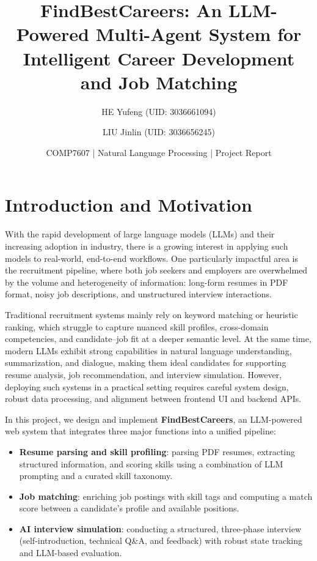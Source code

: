 \documentclass[11pt,a4paper]{article}
\title{\textbf{FindBestCareers: An LLM-Powered Multi-Agent System for Intelligent Career Development and Job Matching}}
\author{
    HE Yufeng (UID: 3036661094)
    \and
    LIU Jinlin (UID: 3036656245)
}
\date{COMP7607 | Natural Language Processing | Project Report}
\begin{document}
\maketitle

\section{Introduction and Motivation}

With the rapid development of large language models (LLMs) and their increasing adoption in industry, there is a growing interest in applying such models to real-world, end-to-end workflows. One particularly impactful area is the recruitment pipeline, where both job seekers and employers are overwhelmed by the volume and heterogeneity of information: long-form resumes in PDF format, noisy job descriptions, and unstructured interview interactions.

Traditional recruitment systems mainly rely on keyword matching or heuristic ranking, which struggle to capture nuanced skill profiles, cross-domain competencies, and candidate--job fit at a deeper semantic level. At the same time, modern LLMs exhibit strong capabilities in natural language understanding, summarization, and dialogue, making them ideal candidates for supporting resume analysis, job recommendation, and interview simulation. However, deploying such systems in a practical setting requires careful system design, robust data processing, and alignment between frontend UI and backend APIs.

In this project, we design and implement \textbf{FindBestCareers}, an LLM-powered web system that integrates three major functions into a unified pipeline:

\begin{itemize}
    \item \textbf{Resume parsing and skill profiling}: parsing PDF resumes, extracting structured information, and scoring skills using a combination of LLM prompting and a curated skill taxonomy.
    \item \textbf{Job matching}: enriching job postings with skill tags and computing a match score between a candidate's profile and available positions.
    \item \textbf{AI interview simulation}: conducting a structured, three-phase interview (self-introduction, technical Q\&A, and feedback) with robust state tracking and LLM-based evaluation.
\end{itemize}
\end{document}
